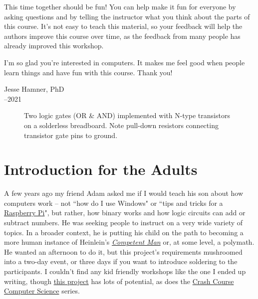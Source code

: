 This time together should be fun! You can help make it fun for everyone by asking questions and by telling the instructor what you think about the parts of this course. It's not easy to teach this material, so your feedback will help the authors improve this course over time, as the feedback from many people has already improved this workshop.

I'm so glad you're interested in computers. It makes me feel good when people learn things and have fun with this course. Thank you!
\bigskip

\noindent Jesse Hamner, PhD\\
--2021\\


\begin{figure}[!hb]
\begin{center}
\medskip
\caption{Two logic gates (OR \& AND) implemented with N-type transistors on a solderless breadboard. Note pull-down resistors connecting transistor gate pins to ground.}
\end{center}
\end{figure}



\section{Introduction for the Adults}

A few years ago my friend Adam asked me if I would teach his son about how computers work -- not ``how do I use Windows" or ``tips and tricks for a {\color{webblue}\href{https://www.raspberrypi.org}{Raspberry Pi}}", but rather, how binary works and how logic circuits can add or subtract numbers. He was seeking people to instruct on a very wide variety of topics. In a broader context, he is putting his child on the path to becoming a more human instance of Heinlein's {\color{webblue}\href{https://en.wikipedia.org/wiki/Competent_man}{\emph{Competent Man}}} or, at some level, a polymath. He wanted an afternoon to do it, but this project's requirements mushroomed into a two-day event, or three days if you want to introduce soldering to the participants. I couldn't find any kid friendly workshops like the one I ended up writing, though {\color{webblue}\href{https://www.raspberrypi.org/blog/digital-making-curriculum/}{this project}} has lots of potential, as does the {\color{webblue}\href{https://www.youtube.com/playlist?list=PLME-KWdxI8dcaHSzzRsNuOLXtM2Ep_C7a}{Crash Course Computer Science}} series. 

